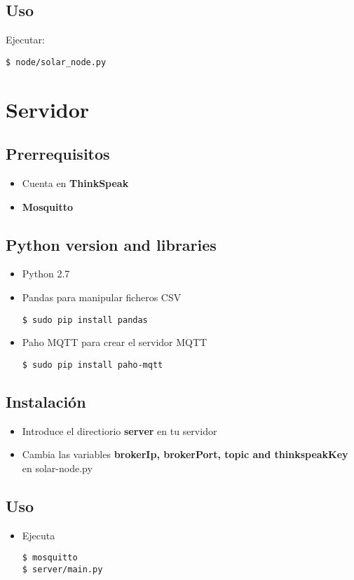 \subsection{Uso}
\label{makereference5.1.5}
Ejecutar:
\begin{lstlisting}[frame=single]
$ node/solar_node.py
\end{lstlisting}

\section{Servidor}
\label{makereference5.2}
\subsection{Prerrequisitos}
\label{makereference5.2.1}
	\begin{itemize}
		\item Cuenta en \textbf{ThinkSpeak}
		\item \textbf{Mosquitto}
	\end{itemize}
\subsection{Python version and libraries}
\label{makereference5.2.2}
	\begin{itemize}
		\item Python 2.7
		\item Pandas para manipular ficheros CSV
\begin{lstlisting}[frame=single]
$ sudo pip install pandas
\end{lstlisting}
		\item Paho MQTT para crear el servidor MQTT
\begin{lstlisting}[frame=single]
$ sudo pip install paho-mqtt
\end{lstlisting}

	\end{itemize}
\subsection{Instalación}
\label{makereference5.2.3}
\begin{itemize}
	\item Introduce el directiorio \textbf{server} en tu servidor
	\item Cambia las variables \textbf{brokerIp, brokerPort, topic and thinkspeakKey} en solar-node.py
\end{itemize}
\subsection{Uso}
\label{makereference5.2.4}
\begin{itemize}
	\item Ejecuta
\begin{lstlisting}[frame=single]
$ mosquitto
$ server/main.py
\end{lstlisting}
\end{itemize}